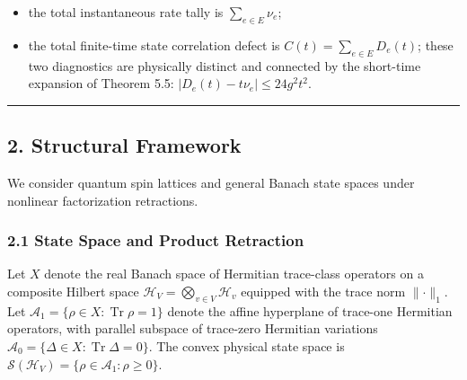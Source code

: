 \documentclass[
  11pt,
]{article}
\providecommand{\tightlist}{%
  \setlength{\itemsep}{0pt}\setlength{\parskip}{0pt}}
\providecommand{\tightlist}{%
  \setlength{\itemsep}{0pt}\setlength{\parskip}{0pt}}
\begin{document}
\begin{enumerate}
  \begin{itemize}
  \tightlist
  \item
    the total instantaneous rate tally is \(\sum_{e\in E} \nu_e\);
  \item
    the total finite-time state correlation defect is \(C(t) = \sum_{e\in E} D_e(t)\);
    these two diagnostics are physically distinct and connected by the short-time expansion of Theorem 5.5: \(|D_e(t) - t\nu_e| \le 24 g^2 t^2\).
  \end{itemize}
\end{enumerate}

\begin{center}\rule{0.5\linewidth}{0.5pt}\end{center}

\subsection{2. Structural Framework}\label{structural-framework}

We consider quantum spin lattices and general Banach state spaces under nonlinear factorization retractions.

\subsubsection{2.1 State Space and Product Retraction}\label{state-space-and-product-retraction}

Let \(X\) denote the real Banach space of Hermitian trace-class operators on a composite Hilbert space \(\mathcal{H}_V = \bigotimes_{v\in V}\mathcal{H}_v\) equipped with the trace norm \(\lVert\cdot\rVert_1\). Let \(\mathcal{A}_1 = \{\rho \in X : \operatorname{Tr}\rho = 1\}\) denote the affine hyperplane of trace-one Hermitian operators, with parallel subspace of trace-zero Hermitian variations \(\mathcal{A}_0 = \{\Delta \in X : \operatorname{Tr}\Delta = 0\}\). The convex physical state space is \(\mathcal{S}(\mathcal{H}_V) = \{\rho \in \mathcal{A}_1 : \rho \ge 0\}\).
\end{document}
